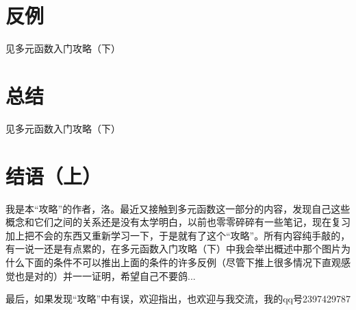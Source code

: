 \documentclass{article}
\begin{document}
\section{反例}
见多元函数入门攻略（下）

\section{总结}
见多元函数入门攻略（下）

\section{结语（上）}
我是本“攻略”的作者，洛。最近又接触到多元函数这一部分的内容，发现自己这些概念和它们之间的关系还是没有太学明白，以前也零零碎碎有一些笔记，现在复习加上把不会的东西又重新学习一下，于是就有了这个“攻略”。所有内容纯手敲的，有一说一还是有点累的，在多元函数入门攻略（下）中我会举出概述中那个图片为什么下面的条件不可以推出上面的条件的许多反例（尽管下推上很多情况下直观感觉也是对的）并一一证明，希望自己不要鸽...

最后，如果发现“攻略”中有误，欢迎指出，也欢迎与我交流，我的qq号2397429787
\end{document}
